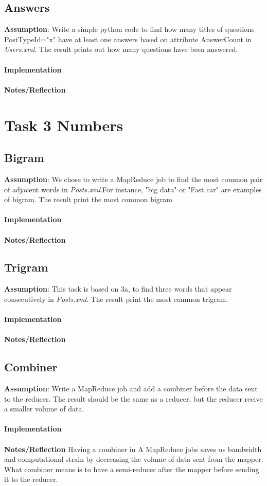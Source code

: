 \documentclass[fleqn,10pt]{wlscirep}
\begin{document}
\subsection{Answers }
\textbf{Assumption}: Write a simple python code to find how many titles of questions PostTypeId="x" have at least one answers based on attribute AnswerCount in \textit{Users.xml}. The result prints out how many questions have been answered.  \\ \\
\textbf{Implementation}  \\ \\
\textbf{Notes/Reflection}


\section{Task 3 Numbers}

\subsection{Bigram }
\textbf{Assumption}: We chose to write a MapReduce job to find the most common pair of adjacent words in \textit{Posts.xml}.For instance, "big data" or "Fast car" are examples of bigram. The result print the most common bigram   \\\\
\textbf{Implementation}  \\ \\
\textbf{Notes/Reflection}


\subsection{Trigram }
\textbf{Assumption}: This task is based on 3a, to find three words that appear consecutively in \textit{Posts.xml}. The result print the most common trigram.  \\ \\
\textbf{Implementation}  \\ \\
\textbf{Notes/Reflection}


\subsection{Combiner }
\textbf{Assumption}: Write a MapReduce job and add a combiner before  the data sent to the reducer. The result should be the same as a reducer, but the reducer recive a smaller volume of data.  \\ \\
\textbf{Implementation}  \\ \\
\textbf{Notes/Reflection} Having a combiner in A MapReduce jobs saves us bandwidth and computational strain by decreasing the volume of data sent from the mapper.  What combiner means is to have a semi-reducer after the mapper before sending it to the reducer. 

\end{document}
